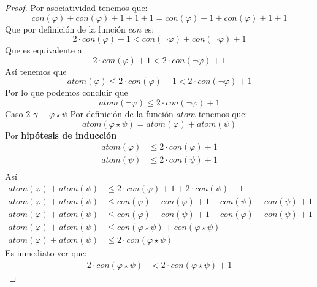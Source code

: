 \documentclass[a4paper]{article}
\begin{document}
\begin{proof}
    Por asociatividad tenemos que:
    \[
        con\left(\varphi\right) + con\left(\varphi\right) + 1 + 1 + 1 = con\left(\varphi\right) + 1 + con\left(\varphi\right) + 1 + 1
    \]
    Que por definición de la función \(con\) es:
    \[
        2 \cdot con\left(\varphi\right) + 1 < con\left(\neg \varphi\right) + con\left(\neg \varphi\right) + 1
    \]
    Que es equivalente a 
    \[
        2 \cdot con\left(\varphi\right) + 1 < 2 \cdot con\left(\neg \varphi\right) + 1
    \]
    Así tenemos que
    \[
        atom\left(\varphi\right) \leq 2 \cdot con\left(\varphi\right) + 1 < 2 \cdot con\left(\neg \varphi\right) + 1
    \]
    Por lo que podemos concluir que
    \[
        atom\left(\neg \varphi\right) \leq 2 \cdot con\left(\neg \varphi\right) + 1
    \]
    Caso 2
    \newline 
    \(\gamma \equiv \varphi \star \psi\)
    \newline
    Por definición de la función \(atom\) tenemos que:
    \[
        atom\left(\varphi \star \psi\right) = atom\left(\varphi\right) + atom\left(\psi\right) 
    \]
    Por \textbf{hipótesis de inducción}
    \begin{align*}
        atom\left(\varphi\right)  &\leq 2 \cdot con\left(\varphi\right) + 1 \\
        atom\left(\psi\right)  &\leq 2 \cdot con\left(\psi\right) + 1 \\
    \end{align*}
    Así
    \begin{align*}
        atom\left(\varphi\right) + atom\left(\psi\right) &\leq 2 \cdot con\left(\varphi\right) + 1 + 2 \cdot con\left(\psi\right) + 1 \\
        atom\left(\varphi\right) + atom\left(\psi\right) &\leq con\left(\varphi\right) + con\left(\varphi\right) + 1 + con\left(\psi\right) + con\left(\psi\right) + 1 \\
        atom\left(\varphi\right) + atom\left(\psi\right) &\leq con\left(\varphi\right) + con\left(\psi\right) + 1 + con\left(\varphi\right) + con\left(\psi\right) + 1 \\
        atom\left(\varphi\right) + atom\left(\psi\right) &\leq con\left(\varphi \star \psi\right) + con\left(\varphi \star \psi\right) \\
        atom\left(\varphi\right) + atom\left(\psi\right) &\leq 2 \cdot con\left(\varphi \star \psi\right)
    \end{align*}
    Es inmediato ver que:
    \begin{align*}
        2 \cdot con\left(\varphi \star \psi\right) &< 2 \cdot con\left(\varphi \star \psi\right) + 1

\end{align*}
\end{proof}
\end{document}
